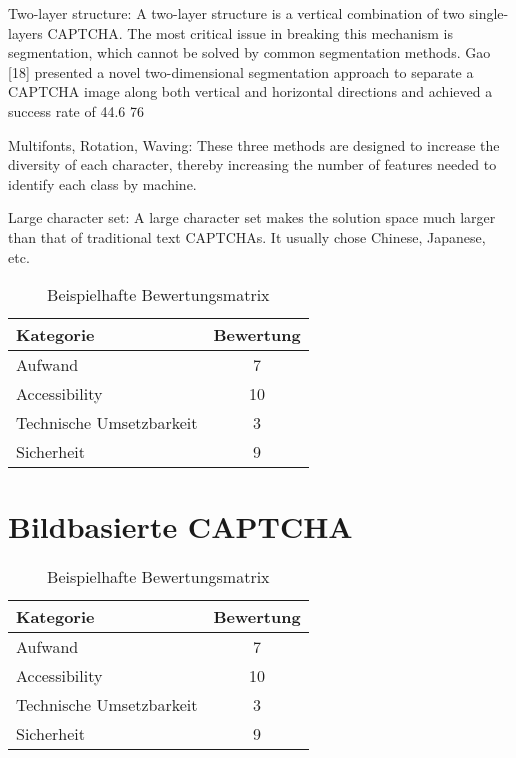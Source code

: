 Two-layer structure: A two-layer structure is a vertical
combination of two single-layers CAPTCHA. The most
critical issue in breaking this mechanism is segmentation,
which cannot be solved by common segmentation methods.
Gao [18] presented a novel two-dimensional segmentation
approach to separate a CAPTCHA image along both vertical
and horizontal directions and achieved a success rate of
44.6%
76

Multifonts, Rotation, Waving: These three methods are
designed to increase the diversity of each character, thereby
increasing the number of features needed to identify each class
by machine.

Large character set: A large character set makes the
solution space much larger than that of traditional text
CAPTCHAs. It usually chose Chinese, Japanese, etc. 
\cite{surveyofresearch}

\begin{table}[h!]
    \caption{Beispielhafte Bewertungsmatrix}
    \begin{center}
        \begin{tabular}{l|c}
            Kategorie                       & Bewertung \\\hline
            Aufwand                         & 7         \\
            Accessibility                   & 10        \\
            Technische Umsetzbarkeit        & 3         \\
            Sicherheit                      & 9         
        \end{tabular}
    \end{center}
\end{table}

\section{Bildbasierte CAPTCHA}

\begin{table}[h!]
    \caption{Beispielhafte Bewertungsmatrix}
    \begin{center}
        \begin{tabular}{l|c}
            Kategorie                       & Bewertung \\\hline
            Aufwand                         & 7         \\
            Accessibility                   & 10        \\
            Technische Umsetzbarkeit        & 3         \\
            Sicherheit                      & 9         
        \end{tabular}
    \end{center}
\end{table}

